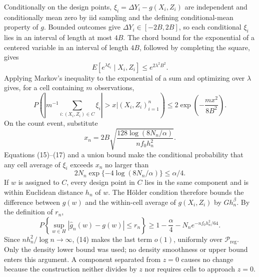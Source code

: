 Conditionally on the design points, \(\xi_i=\Delta Y_i-g(X_i,Z_i)\) are independent and conditionally mean zero by iid sampling and the defining conditional-mean property of \(g\). Bounded outcomes give \(\Delta Y_i\in[-2B,2B]\), so each conditional \(\xi_i\) lies in an interval of length at most \(4B\). The chord bound for the exponential of a centered variable in an interval of length \(4B\), followed by completing the square, gives
\[
 E[e^{\lambda\xi_i}\mid X_i,Z_i]\leq e^{2\lambda^2B^2}.
\]
Applying Markov's inequality to the exponential of a sum and optimizing over \(\lambda\) gives, for a cell containing \(m\) observations,
\[
 P\!\left(\left|m^{-1}\sum_{i:(X_i,Z_i)\in C}\xi_i\right|>x
 \mathrel{\Big|}(X_i,Z_i)_{i=1}^n\right)
 \leq2\exp\!\left(-\frac{mx^2}{8B^2}\right).                   \tag{17}
\]
On the count event, substitute
\[
 x_n=2B\sqrt{\frac{128\log(8N_n/\alpha)}{nf_0h_n^2}}.
\]
Equations (15)--(17) and a union bound make the conditional probability that any cell average of \(\xi_i\) exceeds \(x_n\) no larger than
\[
 2N_n\exp\{-4\log(8N_n/\alpha)\}\leq\alpha/4.                  \tag{18}
\]
If \(w\) is assigned to \(C\), every design point in \(C\) lies in the same component and is within Euclidean distance \(h_n\) of \(w\). The H\"older condition therefore bounds the difference between \(g(w)\) and the within-cell average of \(g(X_i,Z_i)\) by \(Gh_n^\beta\). By the definition of \(r_n\),
\[
 P\!\left\{\sup_{w\in H}|\widehat g_n(w)-g(w)|\leq r_n\right\}
 \geq1-\frac\alpha4-N_ne^{-nf_0h_n^2/64}.                        \tag{19}
\]
Since \(nh_n^2/\log n\to\infty\), (14) makes the last term \(o(1)\), uniformly over \(\mathcal P_{\mathrm{reg}}\). Only the density lower bound was used; no density smoothness or upper bound enters this argument. A component separated from \(z=0\) causes no change because the construction neither divides by \(z\) nor requires cells to approach \(z=0\).


